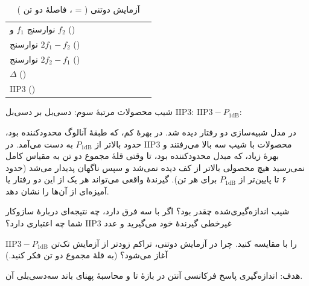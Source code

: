 \documentclass[a4paper,11pt]{article}
\begin{document}
\begin{table}[H]
	\centering\small
	\caption{آزمایش دوتنی ( = \blank[1cm] ، فاصلهٔ دو تن )}
	\label{tab:ip3}
	\begin{tabularx}{\linewidth}{|X|Y|Y|Y|Y|Y|Y|Y|Y|}
		\hline
		\hdrrow {} & \rowstrut & & & & & & & \\ \hline
		نوارسنج $f_1$ و $f_2$ (\dBFS) & \rowstrut & & & & & & & \\ \hline
		نوارسنج $2f_1 - f_2$ (\dBFS) & \rowstrut & & & & & & & \\ \hline
		نوارسنج $2f_2 - f_1$ (\dBFS) & \rowstrut & & & & & & & \\ \hline
		$\Delta$ () & \rowstrut & & & & & & & \\ \hline
		$\mathrm{IIP3}$ () & \rowstrut & & & & & & & \\ \hline
	\end{tabularx}
\end{table}
\noindent
{\small شیب محصولات مرتبهٔ سوم: \blank[1.4cm] دسی‌بل بر دسی‌بل \hfill $\mathrm{IIP3}$: \blank[1.6cm]  \hfill $\mathrm{IIP3} - P_{\mathrm{1dB}}$: \blank[1.4cm] }

\begin{expectbox}
در مدل شبیه‌سازی دو رفتار دیده شد. در بهرهٔ کم، که طبقهٔ آنالوگ محدودکننده بود، محصولات با شیب سه بالا می‌رفتند و
$\mathrm{IIP3}$
حدود
بالاتر از
$P_{\mathrm{1dB}}$
به دست می‌آمد. در بهرهٔ زیاد، که مبدل محدودکننده بود، تا وقتی قلهٔ مجموع دو تن به مقیاس کامل نمی‌رسید هیچ محصولی بالاتر از کف دیده نمی‌شد و سپس ناگهان پدیدار می‌شد (حدود ۶ تا
پایین‌تر از
$P_{\mathrm{1dB}}$
برای هر تن). گیرندهٔ واقعی می‌تواند هر یک از این دو رفتار یا آمیزه‌ای از آن‌ها را نشان دهد.
\end{expectbox}

\begin{question}
شیب اندازه‌گیری‌شده چقدر بود؟ اگر با سه فرق دارد، چه نتیجه‌ای دربارهٔ سازوکار غیرخطی گیرندهٔ خود می‌گیرید و عدد
$\mathrm{IIP3}$
شما چه اعتباری دارد؟
\end{question}
\begin{question}
$\mathrm{IIP3} - P_{\mathrm{1dB}}$
را با
مقایسه کنید. چرا در آزمایش دوتنی، تراکم زودتر از آزمایش تک‌تن آغاز می‌شود؟ (به قلهٔ مجموع دو تن فکر کنید.)
\end{question}
\label{part:antenna_response}


هدف: اندازه‌گیری پاسخ فرکانسی آنتن در بازهٔ
  تا 
   و محاسبهٔ پهنای باند سه‌دسی‌بلی آن.
\end{document}

